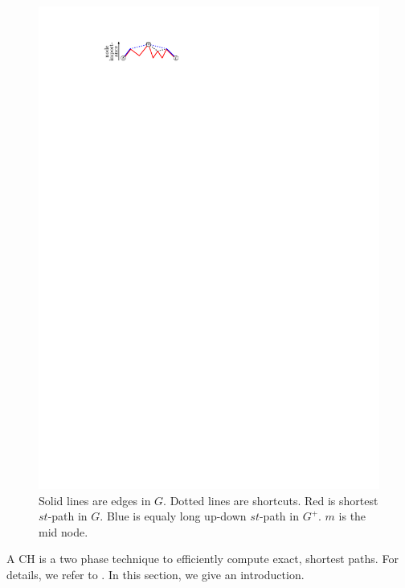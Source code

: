 \documentclass[manuscript,review]{acmart}
\begin{document}
\begin{figure}
\centering
\includegraphics{fig/ch}
\caption{
Solid lines are edges in $G$. Dotted lines are shortcuts. Red is shortest $st$-path in $G$. Blue is equaly long up-down $st$-path in $G^+$. $m$ is the mid node.
}
\label{fig:ch}
\end{figure}

A CH is a two phase technique to efficiently compute exact, shortest paths.
For details, we refer to \cite{gssv-erlrn-12,dsw-cch-15}.
In this section, we give an introduction.
\end{document}
